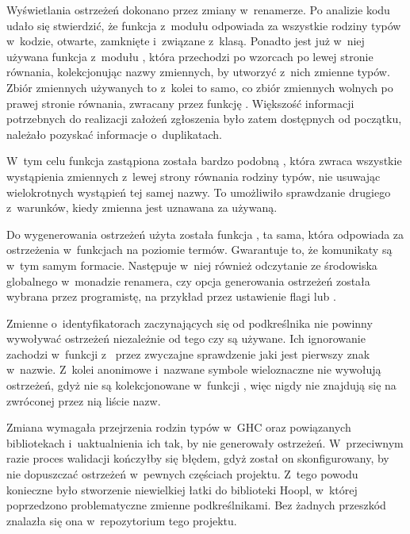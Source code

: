 Wyświetlania ostrzeżeń dokonano przez zmiany w~renamerze. Po analizie kodu udało
się stwierdzić, że funkcja  z~modułu  odpowiada za wszystkie rodziny
typów w~kodzie, otwarte, zamknięte i~związane z~klasą. Ponadto jest już w~niej
używana funkcja  z~modułu , która
przechodzi po wzorcach po lewej stronie równania,
kolekcjonując nazwy zmiennych, by utworzyć z~nich zmienne typów. Zbiór zmiennych
używanych to z~kolei to samo, co zbiór zmiennych wolnych po prawej stronie
równania, zwracany przez funkcję . Większość informacji
potrzebnych do realizacji założeń zgłoszenia było zatem dostępnych od początku,
należało pozyskać informacje o~duplikatach.

W~tym celu funkcja  zastąpiona została
bardzo podobną , która zwraca wszystkie
wystąpienia zmiennych z~lewej strony równania rodziny typów, nie usuwając wielokrotnych wystąpień tej samej
nazwy. To umożliwiło sprawdzanie drugiego z~warunków, kiedy zmienna jest
uznawana za używaną.

Do wygenerowania ostrzeżeń użyta została funkcja , ta
sama, która odpowiada za ostrzeżenia w~funkcjach na poziomie termów. Gwarantuje
to, że komunikaty są w~tym samym formacie. Następuje w~niej również
odczytanie ze środowiska globalnego w~monadzie renamera, czy opcja generowania
ostrzeżeń została wybrana przez programistę, na przykład przez ustawienie flagi
 lub .

Zmienne o~identyfikatorach zaczynających się od podkreślnika nie powinny wywoływać
ostrzeżeń niezależnie od tego czy są używane. Ich ignorowanie zachodzi
w~funkcji  z~ przez zwyczajne sprawdzenie jaki
jest pierwszy znak w~nazwie.
Z~kolei anonimowe i~nazwane symbole wieloznaczne nie wywołują ostrzeżeń, gdyż nie
są kolekcjonowane w~funkcji , więc nigdy nie
znajdują się na zwróconej przez nią liście nazw.

Zmiana wymagała przejrzenia rodzin typów w~GHC oraz powiązanych bibliotekach
i~uaktualnienia ich tak, by nie generowały ostrzeżeń. W~przeciwnym razie proces
walidacji kończyłby się błędem, gdyż został on skonfigurowany, by nie dopuszczać
ostrzeżeń w~pewnych częściach projektu. Z~tego powodu konieczne było stworzenie
niewielkiej łatki do biblioteki Hoopl, w~której poprzedzono problematyczne
zmienne podkreślnikami. Bez żadnych przeszkód znalazła się ona w~repozytorium
tego projektu.

